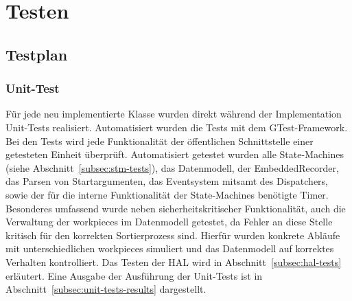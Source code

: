 \chapter{Testen}\label{ch:testen}



\section{Testplan}\label{sec:testplan}




\subsection{Unit-Test}\label{subsec:unit-tests}
Für jede neu implementierte Klasse wurden direkt während der Implementation Unit-Tests realisiert.
Automatisiert wurden die Tests mit dem GTest-Framework.
Bei den Tests wird jede Funktionalität der öffentlichen Schnittstelle einer getesteten Einheit überprüft.
Automatisiert getestet wurden alle State-Machines (siehe Abschnitt~\ref{subsec:stm-tests}), das
Datenmodell, der EmbeddedRecorder, das Parsen von Startargumenten,
das Eventsystem mitsamt des Dispatchers, sowie der für die interne Funktionalität der State-Machines benötigte Timer.
Besonderes umfassend wurde neben sicherheitskritischer Funktionalität, auch die Verwaltung der \glspl{workpiece} im Datenmodell getestet,
da Fehler an diese Stelle kritisch für den korrekten Sortierprozess sind.
Hierfür wurden konkrete Abläufe mit unterschiedlichen \glspl{workpiece} simuliert
und das Datenmodell auf korrektes Verhalten kontrolliert.
Das Testen der HAL wird in Abschnitt~\ref{subsec:hal-tests} erläutert.
Eine Ausgabe der Ausführung der Unit-Tests ist in
Abschnitt~\ref{subsec:unit-tests-results} dargestellt.


